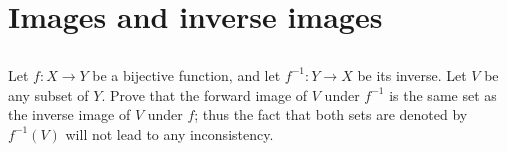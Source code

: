 \documentclass[../../main.tex]{subfiles}
\begin{document}
\ifmainfile
\else
    \ifchapfile
    \else
        \addtocounter{chapter}{3}
        \addtocounter{section}{3}
        \makeatletter
        \begin{flushright}
            \@title \\
            \@author \\
            \@date
        \end{flushright}
    \fi
\fi

\section{Images and inverse images}
\subsection{}
\begin{q}
    Let $f \colon X \to Y$ be a bijective function, and let $f^{-1} \colon Y \to X$ be its inverse. Let $V$ be any subset of $Y$. Prove that the forward image of $V$ under $f^{-1}$ is the same set as the inverse image of $V$ under $f$; thus the fact that both sets are denoted by $f^{-1}(V)$ will not lead to any inconsistency.
\end{q}
    
\end{document}
